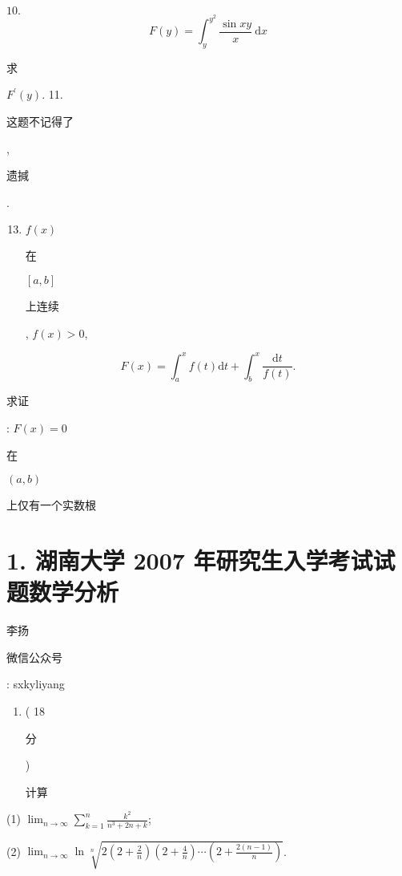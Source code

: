\documentclass[10pt]{article}
\begin{document}
$10 .$
$$
F(y)=\int_{y}^{y^{2}} \frac{\sin x y}{x} \mathrm{~d} x
$$
\begin{CJK}{UTF8}{mj}求\end{CJK} $F^{\prime}(y)$. 11. \begin{CJK}{UTF8}{mj}这题不记得了\end{CJK}, \begin{CJK}{UTF8}{mj}遗㨔\end{CJK}.

\begin{enumerate}
  \setcounter{enumi}{12}
  \item $f(x)$ \begin{CJK}{UTF8}{mj}在\end{CJK} $[a, b]$ \begin{CJK}{UTF8}{mj}上连续\end{CJK}, $f(x)>0$,
\end{enumerate}
$$
F(x)=\int_{a}^{x} f(t) \mathrm{d} t+\int_{b}^{x} \frac{\mathrm{d} t}{f(t)} .
$$
\begin{CJK}{UTF8}{mj}求证\end{CJK}: $F(x)=0$ \begin{CJK}{UTF8}{mj}在\end{CJK} $(a, b)$ \begin{CJK}{UTF8}{mj}上仅有一个实数根\end{CJK}

\section{1. 湖南大学 2007 年研究生入学考试试题数学分析}
\begin{CJK}{UTF8}{mj}李扬\end{CJK}

\begin{CJK}{UTF8}{mj}微信公众号\end{CJK}: sxkyliyang

\begin{enumerate}
  \item ( 18 \begin{CJK}{UTF8}{mj}分\end{CJK}) \begin{CJK}{UTF8}{mj}计算\end{CJK}
\end{enumerate}
(1) $\lim _{n \rightarrow \infty} \sum_{k=1}^{n} \frac{k^{2}}{n^{3}+2 n+k}$;

(2) $\lim _{n \rightarrow \infty} \ln \sqrt[n]{2\left(2+\frac{2}{n}\right)\left(2+\frac{4}{n}\right) \cdots\left(2+\frac{2(n-1)}{n}\right)}$.
\end{document}
